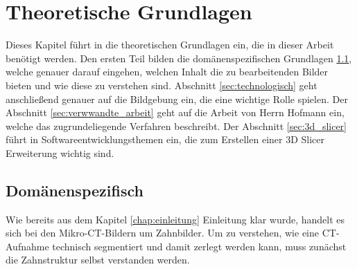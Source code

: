 \chapter{Theoretische Grundlagen}
\label{chap:theoretische_grundlagen} Dieses Kapitel führt in die theoretischen Grundlagen
ein, die in dieser Arbeit benötigt werden. Den ersten Teil bilden die domänenspezifischen
Grundlagen \ref{sec:domänenspezifisch}, welche genauer darauf eingehen, welchen Inhalt
die zu bearbeitenden Bilder bieten und wie diese zu verstehen sind. Abschnitt
\ref{sec:technologisch} geht anschließend genauer auf die Bildgebung ein, die eine
wichtige Rolle spielen. Der Abschnitt \ref{sec:verwwandte_arbeit} geht auf die
Arbeit von Herrn Hofmann ein, welche das zugrundeliegende Verfahren beschreibt.
Der Abschnitt \ref{sec:3d_slicer} führt in Softwareentwicklungsthemen ein, die zum
Erstellen einer 3D Slicer Erweiterung wichtig sind.

\section{Domänenspezifisch}
\label{sec:domänenspezifisch} Wie bereits aus dem Kapitel \ref{chap:einleitung} Einleitung
klar wurde, handelt es sich bei den Mikro-\ac{CT}-Bildern um Zahnbilder. Um zu
verstehen, wie eine \ac{CT}-Aufnahme technisch segmentiert und damit zerlegt
werden kann, muss zunächst die Zahnstruktur selbst verstanden werden.

